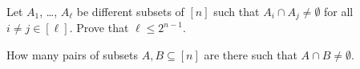\documentclass[addpoints]{exam}
\begin{document}
  \pagestyle{headandfoot}
  \runningheadrule

  \firstpagefooter{}{}{}
  \runningfooter{}{}{}
  \begin{flushright}

    \vspace{0.2in}
  \end{flushright}

  \begin{questions}
    \question[10]
      Let $A_1$, \dots, $A_\ell$ be different subsets of $[n]$ such that $A_i \cap A_j
			\neq \emptyset$ for all $i \neq j \in [\ell]$. Prove that $\ell \le 2^{n - 1}$.

      \begin{solution}[\stretch{1}]
      \end{solution}
      \newpage
    \question[10]
      How many pairs of subsets $A, B \subseteq [n]$ are there such that $A \cap B
			\neq \emptyset$.

      \begin{solution}[\stretch{1}]
      \end{solution}
      \newpage
  \end{questions}
\end{document}
